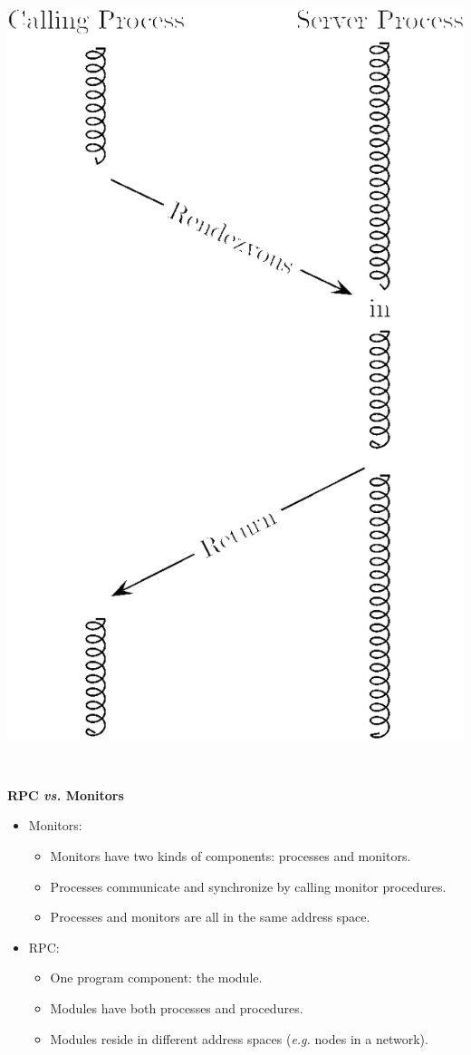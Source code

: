 \documentclass{article}
\newcommand{\bi}{\begin{itemize}}
\newcommand{\ii}{\item}
\newcommand{\ei}{\end{itemize}}
\newcommand{\ti}[1]{
\newpage
\mbox{~}

\vspace{1.25in}
\centerline{\bf #1}
}
\begin{document}
\includegraphics[scale=0.4]{figures/rendezvous.png}

\ti{RPC {\em vs.} Monitors}
\bi
\ii Monitors:
\bi
\ii Monitors have two kinds of components:  processes and monitors.
\ii Processes communicate and synchronize by calling monitor procedures.
\ii Processes and monitors are all in the same address space.
\ei
\ii RPC:
\bi
\ii One program component: the module.
\ii Modules have both processes and procedures.
\ii Modules reside in different address spaces ({\em e.g.} nodes in a
network). 
\ei
\ei
\end{document}
